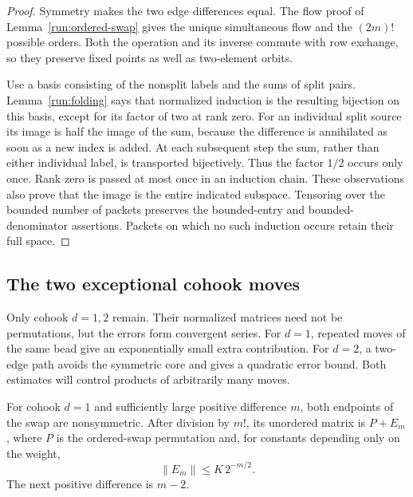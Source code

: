\begin{proof}
Symmetry makes the two edge differences equal.  The flow proof
of Lemma~\ref{run:ordered-swap} gives the unique simultaneous
flow and the \((2m)!\) possible orders.  Both the operation and
its inverse commute with row exchange, so they preserve fixed
points as well as two-element orbits.

Use a basis consisting of the nonsplit labels and the sums of
split pairs.  Lemma~\ref{run:folding} says that normalized
induction is the resulting bijection on this basis, except
for its factor of two at rank zero.  For an individual split
source its image is half the image of the sum, because the
difference is annihilated as soon as a new index is added.
At each subsequent step the sum, rather than either individual
label, is transported bijectively.  Thus the factor \(1/2\)
occurs only once.  Rank zero is passed at most once in an
induction chain.  These observations also prove that the image
is the entire indicated subspace.  Tensoring over the bounded
number of packets preserves the bounded-entry and
bounded-denominator assertions.  Packets on which no such
induction occurs retain their full space.
\end{proof}

\subsection{The two exceptional cohook moves}

Only cohook \(d=1,2\) remain.  Their normalized matrices need not
be permutations, but the errors form convergent series.  For
\(d=1\), repeated moves of the same bead give an exponentially
small extra contribution.  For \(d=2\), a two-edge path avoids
the symmetric core and gives a quadratic error bound.  Both
estimates will control products of arbitrarily many moves.

\begin{lemma}\label{run:d-one}
For cohook \(d=1\) and sufficiently large positive difference
\(m\), both endpoints of the swap are nonsymmetric.
After division by \(m!\), its unordered matrix is \(P+E_m\),
where \(P\) is the ordered-swap permutation and, for constants
depending only on the weight,
\[
 \|E_m\|\leq K\,2^{-m/2}.
 \]
The next positive difference is \(m-2\).
\end{lemma}

